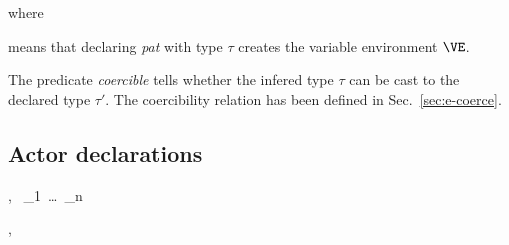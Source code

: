 
\newpage
where 


means that declaring \emph{pat} with type $\tau$ creates the variable environment $\VE$.

\medskip
The predicate \emph{coercible} tells whether the infered type $\tau$ can be cast to the declared type
$\tau'$. The coercibility relation has been defined in Sec.~\ref{sec:e-coerce}.








\subsection{Actor declarations}
\label{sec:typing-actors}


{\TE,\VE~ \vdash {}_1~\ldots~_n \gives {}}

{\TE,\VE~ \vdash
  \actorr~~~~~~
  }

